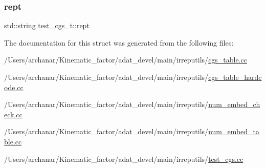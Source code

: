 \subsubsection{\texorpdfstring{rept}{rept}}
{\footnotesize\ttfamily std\+::string test\+\_\+cgs\+\_\+t\+::rept}



The documentation for this struct was generated from the following files\+:\begin{DoxyCompactItemize}
\item 
/\+Users/archanar/\+Kinematic\+\_\+factor/adat\+\_\+devel/main/irreputils/\mbox{\hyperlink{cgs__table_8cc}{cgs\+\_\+table.\+cc}}\item 
/\+Users/archanar/\+Kinematic\+\_\+factor/adat\+\_\+devel/main/irreputils/\mbox{\hyperlink{cgs__table__hardcode_8cc}{cgs\+\_\+table\+\_\+hardcode.\+cc}}\item 
/\+Users/archanar/\+Kinematic\+\_\+factor/adat\+\_\+devel/main/irreputils/\mbox{\hyperlink{num__embed__check_8cc}{num\+\_\+embed\+\_\+check.\+cc}}\item 
/\+Users/archanar/\+Kinematic\+\_\+factor/adat\+\_\+devel/main/irreputils/\mbox{\hyperlink{num__embed__table_8cc}{num\+\_\+embed\+\_\+table.\+cc}}\item 
/\+Users/archanar/\+Kinematic\+\_\+factor/adat\+\_\+devel/main/irreputils/\mbox{\hyperlink{test__cgs_8cc}{test\+\_\+cgs.\+cc}}\end{DoxyCompactItemize}
